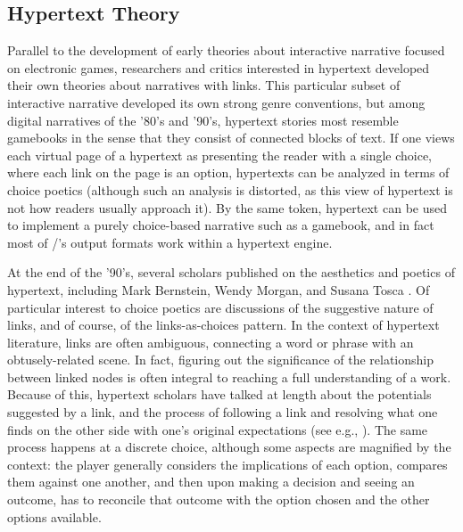 
\subsection{Hypertext Theory}

Parallel to the development of early theories about interactive narrative focused on electronic games, researchers and critics interested in hypertext developed their own theories about narratives with links.
%
This particular subset of interactive narrative developed its own strong genre conventions, but among digital narratives of the '80's and '90's, hypertext stories most resemble gamebooks in the sense that they consist of connected blocks of text.
%
If one views each virtual page of a hypertext as presenting the reader with a single choice, where each link on the page is an option, hypertexts can be analyzed in terms of choice poetics (although such an analysis is distorted, as this view of hypertext is not how readers usually approach it).
%
By the same token, hypertext can be used to implement a purely choice-based narrative such as a gamebook, and in fact most of \dunyazad/'s output formats work within a hypertext engine.


At the end of the '90's, several scholars published on the aesthetics and poetics of hypertext, including Mark Bernstein, Wendy Morgan, and Susana Tosca \citep{Bernstein1998,Morgan1999,Tosca1999,Tosca2000}.
%
Of particular interest to choice poetics are discussions of the suggestive nature of links, and of course, of the links-as-choices pattern.
%
In the context of hypertext literature, links are often ambiguous, connecting a word or phrase with an obtusely-related scene.
%
In fact, figuring out the significance of the relationship between linked nodes is often integral to reaching a full understanding of a work.
%
Because of this, hypertext scholars have talked at length about the potentials suggested by a link, and the process of following a link and resolving what one finds on the other side with one's original expectations (see e.g., \citep{Tosca2000}).
%
The same process happens at a discrete choice, although some aspects are magnified by the context: the player generally considers the implications of each option, compares them against one another, and then upon making a decision and seeing an outcome, has to reconcile that outcome with the option chosen and the other options available.


